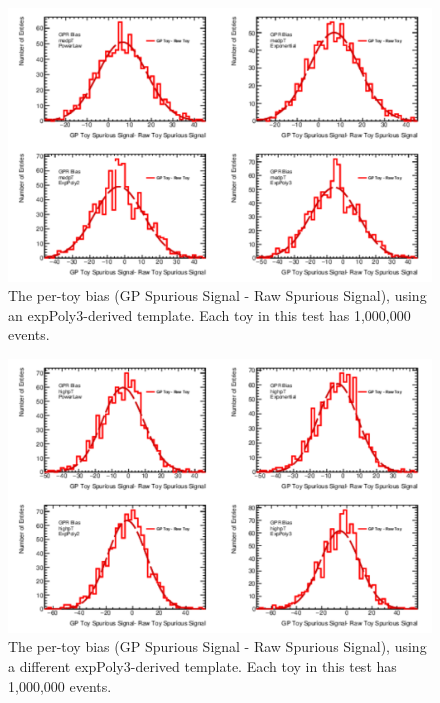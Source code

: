 \begin{figure} 
\begin{center}
  \includegraphics[width=\textwidth]{figures/background/gpr/validation/nominal/ToyTest_FitSigBiases_medpT_1M_noSig}   
\caption{The per-toy bias (GP Spurious Signal - Raw Spurious Signal), using an expPoly3-derived template. Each toy in this test has 1,000,000 events.}
\label{fig:bias_medpt_1M_noSig}
\end{center}
\end{figure}

\begin{figure} 
\begin{center}
  \includegraphics[width=\textwidth]{figures/background/gpr/validation/nominal/ToyTest_FitSigBiases_highpT_1M_noSig}   
\caption{The per-toy bias (GP Spurious Signal - Raw Spurious Signal), using a different expPoly3-derived template. Each toy in this test has 1,000,000 events.}
\label{fig:bias_highpt_1M_noSig}
\end{center}
\end{figure}

